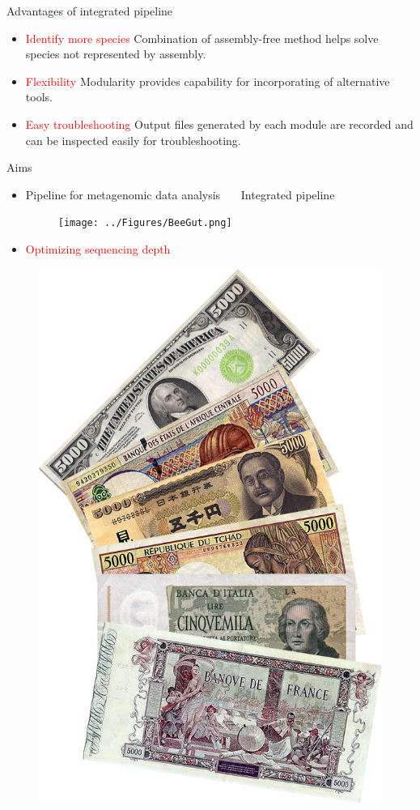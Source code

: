 \documentclass{beamer}
\begin{document}
\begin{frame}{Advantages of integrated pipeline}
    \begin{itemize}
        \item \textcolor{red}{Identify more species}
        \newline Combination of assembly-free method helps solve species not represented by assembly.
        \item \textcolor{red}{Flexibility}
        \newline Modularity provides capability for incorporating of alternative tools.
        \item \textcolor{red}{Easy troubleshooting}
        \newline Output files generated by each module are recorded and can be inspected easily for troubleshooting.
    \end{itemize}
\end{frame}

\begin{frame}{Aims}
    \begin{itemize}
        \item Pipeline for metagenomic data analysis
        \newline \ \ \ Integrated pipeline
        \begin{figure}
            \texttt{[image: ../Figures/BeeGut.png]}
        \end{figure}
        \item \textcolor{red}{Optimizing sequencing depth}
    \end{itemize}
    \begin{figure}
        \includegraphics[height=0.4\textwidth]{../Figures/Billets_de_5000.jpg}
    \end{figure}
\end{frame}
\end{document}
